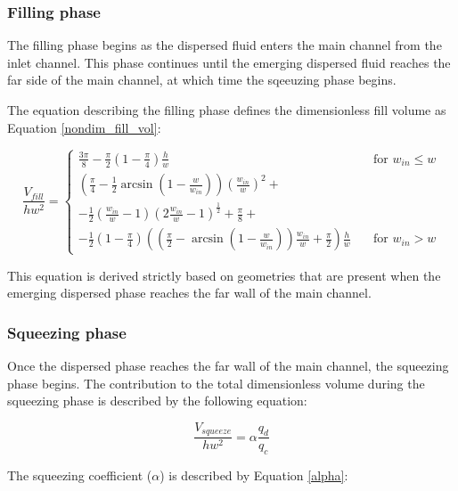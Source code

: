 \subsubsection{Filling phase}

The filling phase begins as the dispersed fluid enters the main
channel from the inlet channel. This phase continues until the emerging
dispersed fluid reaches the far side of the main channel, at which time
the sqeeuzing phase begins.

The equation describing the filling phase defines the dimensionless fill volume as
Equation \eqref{nondim_fill_vol}:

\begin{equation}
  \frac{V_{fill}}{hw^{2}} = 
    \begin{cases}
      \frac{3\pi}{8} - \frac{\pi}{2} \left(1 - \frac{\pi}{4}\right) \frac{h}{w} & \quad \text{for } w_{in} \leq w\\
      \left(\frac{\pi}{4} - \frac{1}{2} \arcsin\left(1-\frac{w}{w_{in}}\right)\right) \left(\frac{w_{in}}{w}\right)^2 + \\
      -\frac{1}{2} \left(\frac{w_{in}}{w} - 1\right) \left(2\frac{w_{in}}{w} - 1\right)^\frac{1}{2} +
      \frac{\pi}{8} + \\
      -\frac{1}{2} \left(1 - \frac{\pi}{4}\right) \left(\left(\frac{\pi}{2} - \arcsin\left(1 - \frac{w}{w_{in}}\right)\right)\frac{w_{in}}{w} + \frac{\pi}{2}\right)\frac{h}{w}
      & \quad \text{for } w_{in} > w
    \end{cases}\label{nondim_fill_vol}
  \end{equation}

This equation is derived strictly based on geometries that are present when the
emerging dispersed phase reaches the far wall of the main channel.

\subsubsection{Squeezing phase}

Once the dispersed phase reaches the far wall of the main channel, the squeezing
phase begins. The contribution to the total dimensionless volume during the
squeezing phase is described by the following equation:

\begin{equation}
  \frac{V_{squeeze}}{hw^2} = {\alpha}\frac{q_d}{q_c}\label{nondim_squeeze_vol}
\end{equation}

The squeezing coefficient ($\alpha$) is described by Equation \eqref{alpha}:

